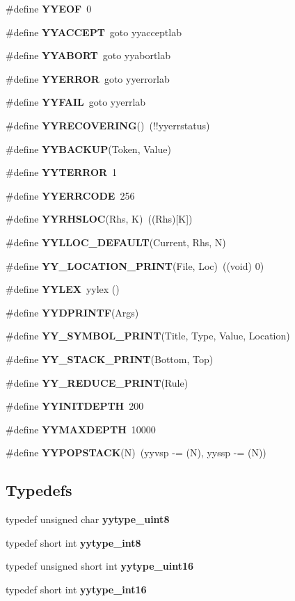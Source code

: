 \begin{DoxyCompactItemize}
\#define {\bf YYEOF}~0
\item 
\#define {\bf YYACCEPT}~goto yyacceptlab
\item 
\#define {\bf YYABORT}~goto yyabortlab
\item 
\#define {\bf YYERROR}~goto yyerrorlab
\item 
\#define {\bf YYFAIL}~goto yyerrlab
\item 
\#define {\bf YYRECOVERING}()~(!!yyerrstatus)
\item 
\#define {\bf YYBACKUP}(Token, Value)
\item 
\#define {\bf YYTERROR}~1
\item 
\#define {\bf YYERRCODE}~256
\item 
\#define {\bf YYRHSLOC}(Rhs, K)~((Rhs)[K])
\item 
\#define {\bf YYLLOC\_\-DEFAULT}(Current, Rhs, N)
\item 
\#define {\bf YY\_\-LOCATION\_\-PRINT}(File, Loc)~((void) 0)
\item 
\#define {\bf YYLEX}~yylex ()
\item 
\#define {\bf YYDPRINTF}(Args)
\item 
\#define {\bf YY\_\-SYMBOL\_\-PRINT}(Title, Type, Value, Location)
\item 
\#define {\bf YY\_\-STACK\_\-PRINT}(Bottom, Top)
\item 
\#define {\bf YY\_\-REDUCE\_\-PRINT}(Rule)
\item 
\#define {\bf YYINITDEPTH}~200
\item 
\#define {\bf YYMAXDEPTH}~10000
\item 
\#define {\bf YYPOPSTACK}(N)~(yyvsp -\/= (N), yyssp -\/= (N))
\end{DoxyCompactItemize}
\subsection*{Typedefs}
\begin{DoxyCompactItemize}
\item 
typedef unsigned char {\bf yytype\_\-uint8}
\item 
typedef short int {\bf yytype\_\-int8}
\item 
typedef unsigned short int {\bf yytype\_\-uint16}
\item 
typedef short int {\bf yytype\_\-int16}
\end{DoxyCompactItemize}

